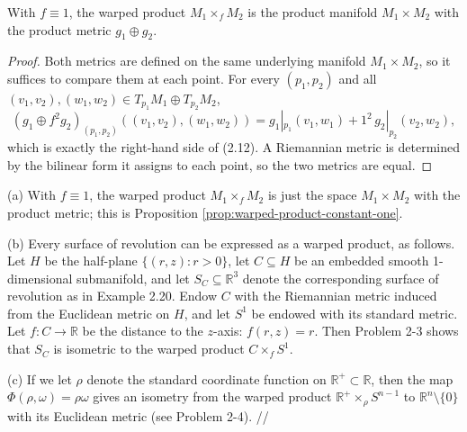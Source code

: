 \begin{proposition}
\label{prop:warped-product-constant-one}
\leanok
{}
With $f \equiv 1$, the warped product $M_1 \times_f M_2$ is the product manifold $M_1 \times M_2$ with the product metric $g_1 \oplus g_2$.
\end{proposition}

\begin{proof}
\leanok
{}
Both metrics are defined on the same underlying manifold $M_1 \times M_2$, so it suffices to compare them at each point. For every $(p_1,p_2)$ and all $(v_1,v_2), (w_1,w_2) \in T_{p_1}M_1 \oplus T_{p_2}M_2$,
\[
(g_1 \oplus f^2 g_2)_{(p_1,p_2)}((v_1,v_2),(w_1,w_2)) = g_1|_{p_1}(v_1,w_1) + 1^2\, g_2|_{p_2}(v_2,w_2),
\]
which is exactly the right-hand side of (2.12). A Riemannian metric is determined by the bilinear form it assigns to each point, so the two metrics are equal.
\end{proof}

\begin{example}
\label{ex:warped-products}

\noindent (a) With $f \equiv 1$, the warped product $M_1 \times_f M_2$ is just the space $M_1 \times M_2$ with the product metric; this is Proposition \ref{prop:warped-product-constant-one}.

\noindent (b) Every surface of revolution can be expressed as a warped product, as follows. Let $H$ be the half-plane $\{(r,z) : r > 0\}$, let $C \subseteq H$ be an embedded smooth 1-dimensional submanifold, and let $S_C \subseteq \mathbb{R}^3$ denote the corresponding surface of revolution as in Example 2.20. Endow $C$ with the Riemannian metric induced from the Euclidean metric on $H$, and let $S^1$ be endowed with its standard metric. Let $f : C \to \mathbb{R}$ be the distance to the $z$-axis: $f(r,z) = r$. Then Problem 2-3 shows that $S_C$ is isometric to the warped product $C \times_f S^1$.

(c) If we let $\rho$ denote the standard coordinate function on $\mathbb{R}^+ \subset \mathbb{R}$, then the map $\Phi(\rho,\omega) = \rho\omega$ gives an isometry from the warped product $\mathbb{R}^+ \times_\rho S^{n-1}$ to $\mathbb{R}^n \setminus \{0\}$ with its Euclidean metric (see Problem 2-4). \hfill //
\end{example}

